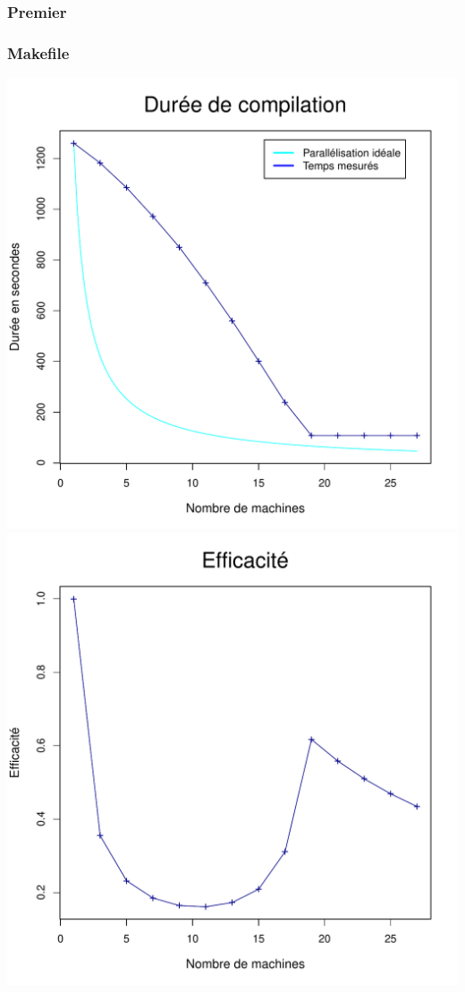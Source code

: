 \documentclass[a4paper, 11pt, titlepage]{article}
\begin{document}
\subsubsection {Premier}

\subsubsection* {Makefile}

\begin{center}
    \includegraphics[scale=0.45]{res/sujet_makefiles_premier_Makefile_nth1.pdf}
    \includegraphics[scale=0.45]{res/sujet_makefiles_premier_Makefile_nth1_eff.pdf}

\end{center}
\end{document}
